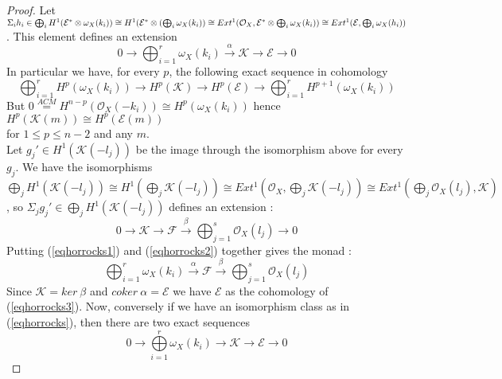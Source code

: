\documentclass[
	oldfontcommands,
	sumario=abnt-6027-2012,
	12pt,			%
	openright,		%
	oneside,		%
	a4paper,		%
	english,		%
	brazil			%
	]{imecc-unicamp}
\begin{document}
\begin{proof}
Let $\Sigma_i h_i \in \bigoplus_i H^1 (\mathcal{E}^* \otimes \omega_X (k_i)) \cong H^1(\mathcal{E}^* \otimes (\bigoplus_i \omega_X (k_i)) \cong \\ Ext^1 (\mathcal{O}_X,\mathcal{E}^* \otimes \bigoplus_i \omega_X (k_i)) \cong Ext^1(\mathcal{E},\bigoplus_i \omega_X (h_i))$. This element defines an extension 
\begin{equation}\label{eqhorrocks1}
0 \to \bigoplus_{i=1}^r \omega_X (k_i) \overset{\alpha}{\to} \mathcal{K} \to \mathcal{E} \to 0
\end{equation}
In particular we have, for every $p$, the following exact sequence in cohomology
\begin{equation}
\bigoplus_{i=1}^r H^p( \omega_X (k_i)) \to H^p(\mathcal{K}) \to H^p(\mathcal{E}) \to \bigoplus_{i=1}^r H^{p+1}( \omega_X (k_i))
\end{equation}
But $0\overset{ACM}{=}H^{n-p}(\mathcal{O}_X (-k_i)) \cong H^p(\omega_X(k_i))$ hence $H^p (\mathcal{K}(m)) \cong H^p (\mathcal{E}(m))$ \\ for $1 \leq p \leq n-2$ and any $m$. \\
Let $g_j ' \in H^1 (\mathcal{K}(-l_j))$ be the image through the isomorphism above for every $g_j$. We have the isomorphisms $ \bigoplus_j H^1(\mathcal{K}(-l_j)) \cong H^1(\bigoplus_j \mathcal{K}(-l_j)) \cong Ext^1 (\mathcal{O}_X,\bigoplus_j \mathcal{K}(-l_j) ) \cong Ext^1(\bigoplus_j \mathcal{O}_X (l_j),\mathcal{K})$, so $\Sigma_j g_j' \in \bigoplus_j H^1(\mathcal{K}(-l_j))$ defines an extension :
\begin{equation}\label{eqhorrocks2}
0 \to \mathcal{K} \to \mathcal{F} \overset{\beta}{\to} \bigoplus_{j=1}^{s} \mathcal{O}_X (l_j) \to 0
\end{equation}
Putting (\ref{eqhorrocks1}) and (\ref{eqhorrocks2}) together gives the monad :
\begin{equation}\label{eqhorrocks3}
\bigoplus_{i=1}^r \omega_X (k_i) \overset{\alpha}{\to} \mathcal{F} \overset{\beta}{\to} \bigoplus_{j=1}^{s} \mathcal{O}_X (l_j)
\end{equation}
Since $\mathcal{K}=ker \ \beta$ and $coker \ \alpha = \mathcal{E}$ we have $\mathcal{E}$ as the cohomology of (\ref{eqhorrocks3}).
Now, conversely if we have an isomorphism class as in (\ref{eqhorrocks}), then there are two exact sequences 
\begin{equation}
0 \to \bigoplus\limits_{i=1}^r \omega_X (k_i) \to \mathcal{K} \to \mathcal{E} \to 0
\end{equation}

\end{proof}
\end{document}

